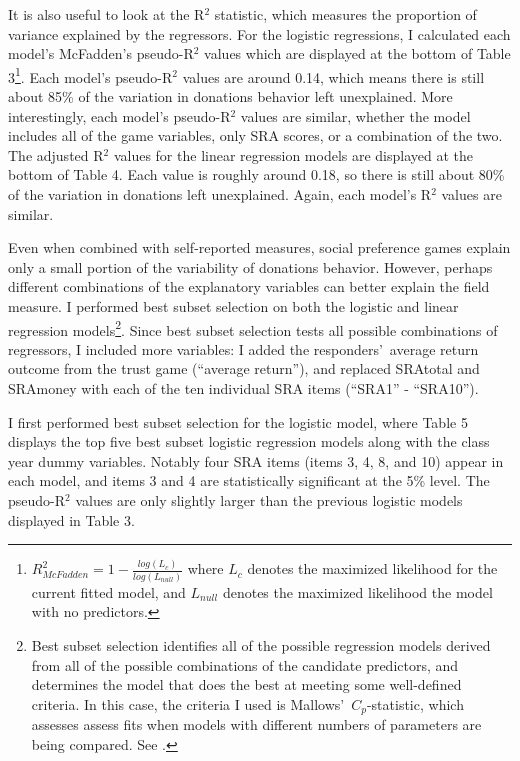 \documentclass[12pt]{article}
\begin{document}
It is also useful to look at the R$^{2}$ statistic, which measures the proportion of variance explained by the regressors. For the logistic regressions, I calculated each model\rq s McFadden\rq s pseudo-R$^{2}$ values which are displayed at the bottom of Table 3\footnote{
\(R^{2}_{McFadden} = 1 - \frac{log(L_{c})}{log(L_{null})}\)
where \(L_{c}\) denotes the maximized likelihood for the current fitted model, and \(L_{null}\) denotes the maximized likelihood the model with no predictors.
}. Each model\rq s pseudo-R$^{2}$ values are around 0.14, which means there is still about 85\% of the variation in donations behavior left unexplained. More interestingly, each model\rq s pseudo-R$^{2}$ values are similar, whether the model includes all of the game variables, only SRA scores, or a combination of the two. The adjusted R$^{2}$ values for the linear regression models are displayed at the bottom of Table 4. Each value is roughly around 0.18, so there is still about 80\% of the variation in donations left unexplained. Again, each model\rq s R$^{2}$ values are similar.


Even when combined with self-reported measures, social preference games explain only a small portion of the variability of donations behavior. However, perhaps different combinations of the explanatory variables can better explain the field measure. I performed best subset selection on both the logistic and linear regression models\footnote{Best subset selection identifies all of the possible regression models derived from all of the possible combinations of the candidate predictors, and determines the model that does the best at meeting some well-defined criteria. In this case, the criteria I used is Mallows\rq \ \(C_{p}\)-statistic, which assesses assess fits when models with different numbers of parameters are being compared.  See \cite{mallows_1973}.}. Since best subset selection tests all possible combinations of regressors, I included more variables: I added the responders\rq \ average return outcome from the trust game (``average return''), and replaced SRAtotal and SRAmoney with each of the ten individual SRA items (``SRA1'' - ``SRA10''). 

I first performed best subset selection for the logistic model, where Table 5 displays the top five best subset logistic regression models along with the class year dummy variables. Notably four SRA items (items 3, 4, 8, and 10) appear in each model, and items 3 and 4 are statistically significant at the 5\% level. The pseudo-R$^{2}$ values are only slightly larger than the previous logistic models displayed in Table 3.
\end{document}
